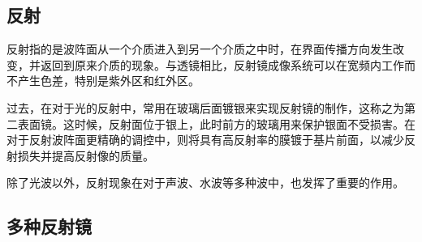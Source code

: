 \begin{issues}
\issueDraft
\issueMissDepend
\end{issues}

\subsection{反射}
反射指的是波阵面从一个介质进入到另一个介质之中时，在界面传播方向发生改变，并返回到原来介质的现象。与透镜相比，反射镜成像系统可以在宽频内工作而不产生色差，特别是紫外区和红外区。

过去，在对于光的反射中，常用在玻璃后面镀银来实现反射镜的制作，这称之为第二表面镜。这时候，反射面位于银上，此时前方的玻璃用来保护银面不受损害。在对于反射波阵面更精确的调控中，则将具有高反射率的膜镀于基片前面，以减少反射损失并提高反射像的质量。

除了光波以外，反射现象在对于声波、水波等多种波中，也发挥了重要的作用。
\subsection{多种反射镜}

